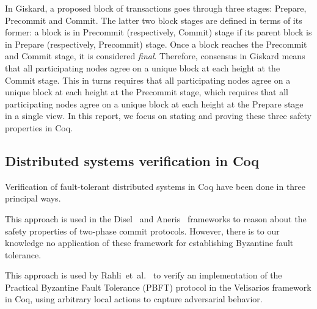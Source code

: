 \documentclass{easychair}
\begin{document}

In Giskard, a proposed block of transactions goes through three stages: Prepare, Precommit and Commit. The latter two block stages are defined in terms of its former: a block is in Precommit (respectively, Commit) stage if its parent block is in Prepare (respectively, Precommit) stage. Once a block reaches the Precommit and Commit stage, it is considered \emph{final}. Therefore, consensus in Giskard means that all participating nodes agree on a unique block at each height at the Commit stage. This in turns requires that all participating nodes agree on a unique block at each height at the Precommit stage, which requires that all participating nodes agree on a unique block at each height at the Prepare stage in a single view. In this report, we focus on stating and proving these three safety properties in Coq.

\subsection{Distributed systems verification in Coq}
Verification of fault-tolerant distributed systems in Coq have been done in three principal ways.

 This approach is used in the Disel~\cite{Sergey2018} and Aneris~\cite{Krogh2020} frameworks to reason about the safety properties of two-phase commit protocols. However, there is to our knowledge no application of these framework for establishing Byzantine fault tolerance.

 This approach is used by Rahli~et~al.~\cite{Rahli2018} to verify an implementation of the Practical Byzantine Fault Tolerance (PBFT) protocol in the Velisarios framework in Coq, using arbitrary local actions to capture adversarial behavior.
\end{document}
